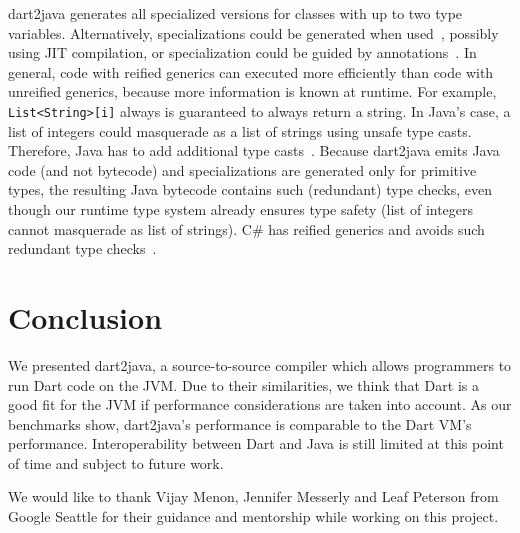 \documentclass[sigplan]{acmart}
\begin{document}
dart2java generates all specialized versions for classes with up to two type variables. Alternatively, specializations could be generated when used~\cite{Kennedy:2001:DIG:378795.378797}, possibly using JIT compilation, or specialization could be guided by annotations~\cite{Dragos:2009:CGT:1565824.1565830}. In general, code with reified generics can executed more efficiently than code with unreified generics, because more information is known at runtime. For example, \texttt{List<String>[i]} always is guaranteed to always return a string. In Java's case, a list of integers could masquerade as a list of strings using unsafe type casts. Therefore, Java has to add additional type casts~\cite{Nino:2007:CEJ:1229688.1229690, BrachaJuly52004}. Because dart2java emits Java code (and not bytecode) and specializations are generated only for primitive types, the resulting Java bytecode contains such (redundant) type checks, even though our runtime type system already ensures type safety (list of integers cannot masquerade as list of strings). C\# has reified generics and avoids such redundant type checks~\cite{Kennedy:2001:DIG:378795.378797}.


\section{Conclusion}
We presented dart2java, a source-to-source compiler which allows programmers to run Dart code on the JVM.  Due to their similarities, we think that Dart is a good fit for the JVM if performance considerations are taken into account. As our benchmarks show, dart2java's performance is comparable to the Dart VM's performance. Interoperability between Dart and Java is still limited at this point of time and subject to future work.

\begin{acks} 
We would like to thank Vijay Menon, Jennifer Messerly and Leaf Peterson from Google Seattle for their guidance and mentorship while working on this project. 
\end{acks}






\appendix
\end{document}
